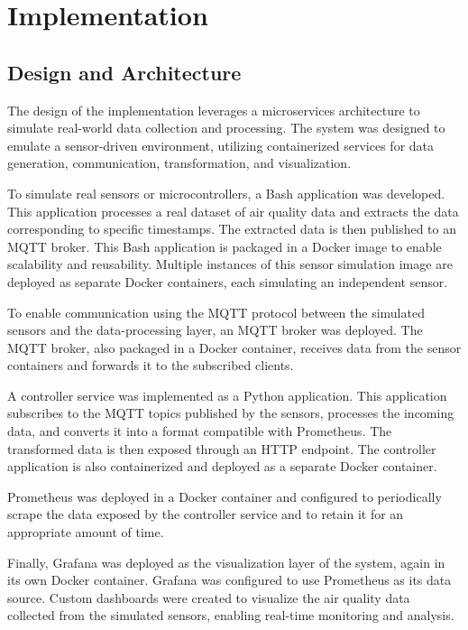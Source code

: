 \chapter{Implementation} \label{ch:implementation}

\section{Design and Architecture}
The design of the implementation leverages a microservices architecture to simulate real-world data collection and processing. The system was designed to emulate a sensor-driven environment, utilizing containerized services for data generation, communication, transformation, and visualization.

To simulate real sensors or microcontrollers, a Bash application was developed. This application processes a real dataset of air quality data and extracts the data corresponding to specific timestamps. The extracted data is then published to an MQTT broker. This Bash application is packaged in a Docker image to enable scalability and reusability. Multiple instances of this sensor simulation image are deployed as separate Docker containers, each simulating an independent sensor.

To enable communication using the MQTT protocol between the simulated sensors and the data-processing layer, an MQTT broker was deployed. The MQTT broker, also packaged in a Docker container, receives data from the sensor containers and forwards it to the subscribed clients.

A controller service was implemented as a Python application. This application subscribes to the MQTT topics published by the sensors, processes the incoming data, and converts it into a format compatible with Prometheus. The transformed data is then exposed through an HTTP endpoint. The controller application is also containerized and deployed as a separate Docker container.

Prometheus was deployed in a Docker container and configured to periodically scrape the data exposed by the controller service and to retain it for an appropriate amount of time.

Finally, Grafana was deployed as the visualization layer of the system, again in its own Docker container. Grafana was configured to use Prometheus as its data source. Custom dashboards were created to visualize the air quality data collected from the simulated sensors, enabling real-time monitoring and analysis.

